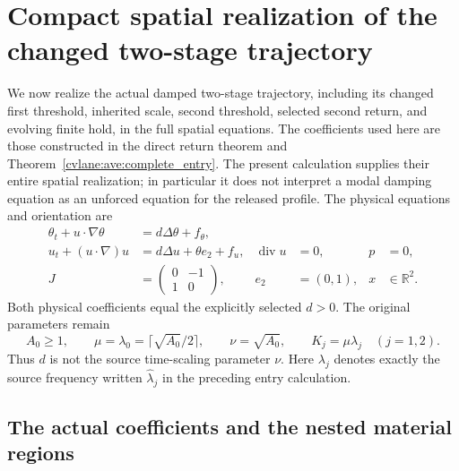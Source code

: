 \section{Compact spatial realization of the changed two-stage trajectory}
\label{cvlane:ms:section}

We now realize the actual damped two-stage trajectory, including its
changed first threshold, inherited scale, second threshold, selected
second return, and evolving finite hold, in the full spatial equations.
The coefficients used here are those constructed in the direct return
theorem and Theorem~\ref{cvlane:ave:complete_entry}. The present calculation supplies their entire
spatial realization; in particular it does not interpret a modal
damping equation as an unforced equation for the released profile.
The physical equations and orientation are
\begin{align*}
 \theta_t+u\cdot\nabla\theta&=d\Delta\theta+f_\theta,\\
 u_t+(u\cdot\nabla)u&=d\Delta u+\theta e_2+f_u,
 &\operatorname{div}u&=0,&p&=0,\\
 J&=\begin{pmatrix}0&-1\\1&0\end{pmatrix},
 &e_2&=(0,1),&x&\in\mathbb R^2.
\end{align*}
Both physical coefficients equal the explicitly selected $d>0$.
The original parameters remain
\[
 A_0\geq1,\qquad\mu=\lambda_0=\lceil\sqrt{A_0}/2\rceil,
 \qquad\nu=\sqrt{A_0},\qquad K_j=\mu\lambda_j\quad(j=1,2).
\]
Thus $d$ is not the source time-scaling parameter $\nu$.
Here $\lambda_j$ denotes exactly the source frequency written
$\widehat\lambda_j$ in the preceding entry calculation.

\subsection{The actual coefficients and the nested material regions}

